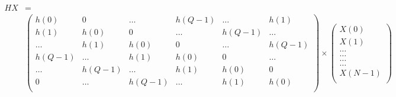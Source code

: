 \begin{equation*}
  \begin{aligned}
	HX&=\\ &
\begin{pmatrix}
h(0) & 0 & \ldots & h(Q-1) & \ldots & h(1)\\ 
h(1)&h(0) & 0 & \ldots & h(Q-1) & \ldots \\ 
\ldots &h(1)&h(0) & 0 & \ldots & h(Q-1) \\ 
h(Q-1)&\ldots &h(1)&h(0) & 0 & \ldots  \\ 
\ldots&h(Q-1)&\ldots &h(1)&h(0) & 0  \\ 
0&\ldots&h(Q-1)&\ldots &h(1)&h(0)   \\ 
\end{pmatrix}
\times 
\begin{pmatrix}
X(0)\\ 
X(1)\\
\ldots\\
\ldots\\
\ldots\\
\ldots\\
X(N-1)\\

\end{pmatrix}
  \end{aligned}
\end{equation*}
